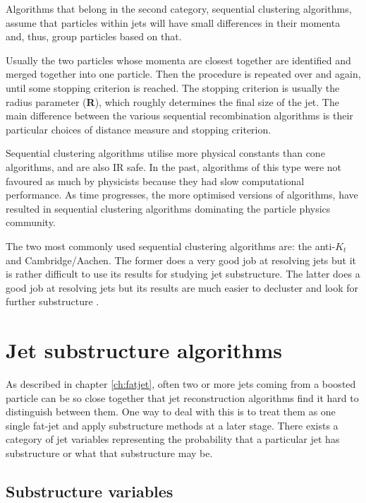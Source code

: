     Algorithms that belong in the second category, sequential clustering algorithms, assume that particles within jets will have small differences in their momenta and, thus, group particles based on that. 

    Usually the two particles whose momenta are closest together are identified and merged together into one particle. Then the procedure is repeated over and again, until some stopping criterion is reached. The stopping criterion is usually the radius parameter (\textbf{R}), which roughly determines the final size of the jet. The main difference between the various sequential recombination algorithms is their particular choices of distance measure and stopping criterion.  

    Sequential clustering algorithms utilise more physical constants than cone algorithms, and are also IR safe. In the past, algorithms of this type were not favoured as much by physicists because they had slow computational performance. As time progresses, the more optimised versions of algorithms, have resulted in sequential clustering algorithms dominating the particle physics community.
    
    The two most commonly used sequential clustering algorithms are: the anti-$K_t$ and Cambridge/Aachen. The former does a very good job at resolving jets but it is rather difficult to use its results for studying jet substructure. The latter does a good job at resolving jets but its results are much easier to decluster and look for further substructure \cite{atkin2015review}.

\section{Jet substructure algorithms}\label{ch:sub_alg}
As described in chapter \ref{ch:fatjet}, often two or more jets coming from a boosted particle can be so close together that jet reconstruction algorithms find it hard to distinguish between them. One way to deal with this is to treat them as one single fat-jet and apply substructure methods at a later stage. There exists a category of jet variables representing the probability that a particular jet has substructure or what that substructure may be.

\subsection{Substructure variables}\label{ch_sub}

